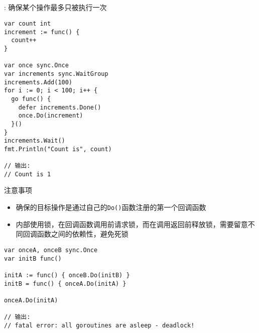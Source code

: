 \subsection{\Once }
\begin{frame}[fragile]{\Once }
  : 确保某个操作最多只被执行一次
  \iffalse
\begin{columns}[T]
    \column{.45\textwidth}    
\begin{lstlisting}[caption={\Once 使用样例},xleftmargin=8pt]
var count int
increment := func() {
  count++
}

var once sync.Once
var increments sync.WaitGroup

increments.Add(100)
for i := 0; i < 100; i++ {
  go func() {
    defer increments.Done()
    once.Do(increment)
  }()
}
\end{lstlisting}

    \column{.5\textwidth}    
\begin{lstlisting}[caption={\Once 使用样例},firstnumber=last,xleftmargin=8pt]
increments.Wait()
fmt.Println("Count is", count)

// 输出:
// Count is 1    
\end{lstlisting}
\end{columns}
\fi
\begin{lstlisting}[caption={\Once 使用样例},xleftmargin=8pt]
var count int
increment := func() {
  count++
}

var once sync.Once
var increments sync.WaitGroup
increments.Add(100)
for i := 0; i < 100; i++ {
  go func() {
    defer increments.Done()
    once.Do(increment)
  }()
}
increments.Wait()
fmt.Println("Count is", count)

// 输出:
// Count is 1    
\end{lstlisting}
\end{frame}

\begin{frame}[fragile]{注意事项}
  \begin{itemize}
      \item \alert{\Once 确保的目标操作是通过自己的\texttt{Do()}函数注册的\alert{第一个}回调函数}
      \item\pause \Once 内部使用锁，在回调函数调用前请求锁，而在调用返回前释放锁，需要\alert{留意不同回调函数之间的依赖性，避免死锁}
  \end{itemize}  

\begin{lstlisting}[caption={\Once 的使用不当导致死锁}]
var onceA, onceB sync.Once
var initB func()

initA := func() { onceB.Do(initB) }
initB = func() { onceA.Do(initA) }

onceA.Do(initA)    

// 输出:
// fatal error: all goroutines are asleep - deadlock!
\end{lstlisting}
\end{frame}
